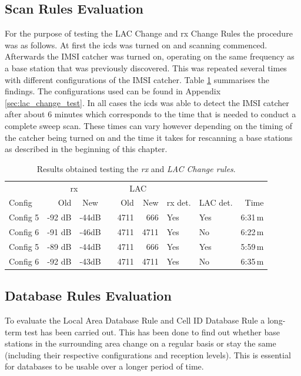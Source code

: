 \subsection{Scan Rules Evaluation}
For the purpose of testing the LAC Change and rx Change Rules the procedure was as follows.
At first the \gls{icds} was turned on and scanning commenced.
Afterwards the IMSI catcher was turned on, operating on the same frequency as a base station that was previously discovered.
This was repeated several times with different configurations of the IMSI catcher.
Table \ref{tab:par_change} summarises the findings.
The configurations used can be found in Appendix \ref{sec:lac_change_test}.
In all cases the \gls{icds} was able to detect the IMSI catcher after about 6 minutes which corresponds to the time that is needed to conduct a complete sweep scan.
These times can vary however depending on the timing of the catcher being turned on and the time it takes for rescanning a base stations as described in the beginning of this chapter.
\begin{table}
\centering
\begin{tabular}{lrcrrrllr}
\toprule
			&\multicolumn{2}{c}{rx}		&\phantom{a}	&\multicolumn{2}{c}{LAC}	&				&	&		\\
			\cmidrule{2-3} 								\cmidrule{5-6} 
Config 		&Old	&New				&				&Old	&New				&rx det.	&LAC det.		&Time\\
\midrule
Config 5	&-92 dB	&-44dB				&				&4711	&666				&Yes		&Yes	&6:31\,m\\
Config 6	&-91 dB	&-46dB				&				&4711	&4711				&Yes		&No		&6:22\,m\\
Config 5	&-89 dB	&-44dB				&				&4711	&666				&Yes		&Yes	&5:59\,m\\
Config 6	&-92 dB	&-43dB				&				&4711	&4711				&Yes		&No		&6:35\,m\\
\bottomrule
\end{tabular}
\caption{Results obtained testing the \emph{rx} and \emph{LAC Change rules}.}
\label{tab:par_change}
\end{table}

\subsection{Database Rules Evaluation}
To evaluate the Local Area Database Rule and Cell ID Database Rule a long-term test has been carried out.
This has been done to find out whether base stations in the surrounding area change on a regular basis or stay the same (including their respective configurations and reception levels).
This is essential for databases to be usable over a longer period of time.

